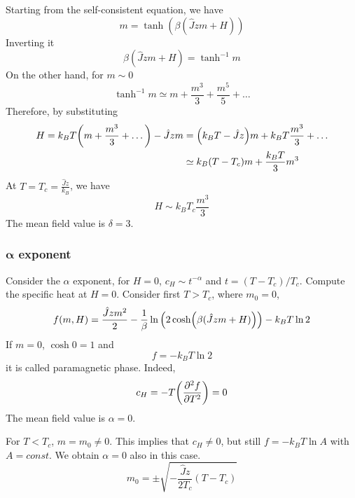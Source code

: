 \documentclass[../main/main.tex]{subfiles}
\begin{document}
Starting from the self-consistent equation, we have
\begin{equation}
  m = \tanh (\beta (\hat{J}zm+H ))
  \label{eq:12_1}
\end{equation}
Inverting it
\begin{equation*}
  \beta (\hat{J}zm+H ) = \tanh^{-1} m
\end{equation*}
On the other hand, for \( m \sim 0 \)
\begin{equation*}
  \tanh^{-1} m \simeq m + \frac{m^3}{3} + \frac{m^5}{5} + \dots
\end{equation*}
Therefore, by substituting
\begin{equation*}
\begin{split}
  H  = k_B T \qty(m+ \frac{m^3}{3} + \dots) - \hat{J} z m
    &= \qty(k_B T - \hat{J}z) m + k_B T \frac{m^3}{3} + \dots \\
    & \simeq k_B (T-T_c)m + \frac{k_B T}{3}m^3
\end{split}
\end{equation*}
At \( T=T_c= \frac{\hat{J}z }{k_B} \), we have
\begin{equation}
  H \sim k_B T_c \frac{m^3}{3}
\end{equation}
The mean field value is \( \delta =3 \).


\subsubsection{\( \pmb{\alpha}  \) exponent}
Consider the \( \alpha  \) exponent, for  \( H=0 \), \( c_H \sim t^{-\alpha } \) and \( t = (T-T_c)/T_c \).
Compute the specific heat at \( H=0 \).
Consider first \( T>T_c \), where \( m_0 =0 \),
\begin{equation*}
  f(m,H) = \frac{\hat{J}zm^2 }{2} - \frac{1}{\beta } \ln{\qty(2\cosh(\beta (\hat{J}zm+H ))) }
  - k_B T \ln 2
\end{equation*}
If \( m=0 \), \( \cosh 0 =1 \) and
\begin{equation*}
  f = -k_B T \ln{2}
\end{equation*}
it is called paramagnetic phase. Indeed,
\begin{equation}
  c_H = - T \qty(\pdv[2]{f}{T} ) = 0
\end{equation}
The mean field value is \( \alpha =0 \).
\begin{remark}
For \( T<T_c \), \( m=m_0 \neq 0 \). This implies that \( c_H \neq 0 \), but still \( f=-k_BT \ln{A}  \) with \( A= const \). We obtain \( \alpha =0 \) also in this case.
\begin{equation*}
  m_0 = \pm \sqrt{- \frac{\hat{J} z}{2T_c}(T-T_c)}
\end{equation*}
\end{remark}
\end{document}
